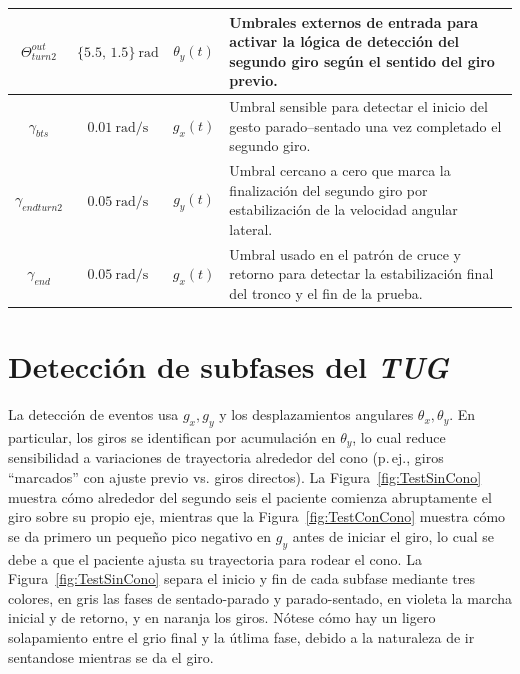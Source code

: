 \documentclass[12pt]{report}
\begin{document}
\begin{justify}
\begin{longtable}{|c|c|c|p{7.2cm}|}
        $\Theta_{turn2}^{out}$       & $\{5.5,\,1.5\}~\text{rad}$ & $\theta_y(t)$       &
        Umbrales externos de entrada para activar la lógica de detección del segundo giro según el sentido del giro previo.                                           \\ \hline

        $\gamma_{bts}$               & $0.01~\text{rad/s}$        & $g_x(t)$            &
        Umbral sensible para detectar el inicio del gesto parado--sentado una vez completado el segundo giro.                                                         \\ \hline

        $\gamma_{endturn2}$          & $0.05~\text{rad/s}$        & $g_y(t)$            &
        Umbral cercano a cero que marca la finalización del segundo giro por estabilización de la velocidad angular lateral.                                          \\ \hline

        $\gamma_{end}$               & $0.05~\text{rad/s}$        & $g_x(t)$            &
        Umbral usado en el patrón de cruce y retorno para detectar la estabilización final del tronco y el fin de la prueba.                                          \\
    \end{longtable}




    \section{Detección de subfases del \textit{TUG}}
    \label{sec:deteccion-subfases-tug}

    La detección de eventos usa $g_x,g_y$ y los desplazamientos angulares $\theta_x,\theta_y$. En particular, los giros se identifican por acumulación en $\theta_y$, lo cual reduce sensibilidad a variaciones de trayectoria alrededor del cono (p.\,ej., giros ``marcados'' con ajuste previo vs. giros directos). La Figura~\ref{fig:TestSinCono} muestra cómo alrededor del segundo seis el paciente comienza abruptamente el giro sobre su propio eje, mientras que la Figura~\ref{fig:TestConCono} muestra cómo se da primero un pequeño pico negativo en $g_y$ antes de iniciar el giro, lo cual se debe a que el paciente ajusta su trayectoria para rodear el cono. La Figura~\ref{fig:TestSinCono} separa el inicio y fin de cada subfase mediante tres colores, en gris las fases de sentado-parado y parado-sentado, en violeta la marcha inicial y de retorno, y en naranja los giros. Nótese cómo hay un ligero solapamiento entre el grio final y la útlima fase, debido a la naturaleza de ir sentandose mientras se da el giro.\\


\end{justify}
\end{document}

